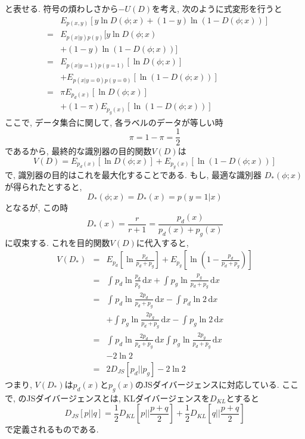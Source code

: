 \documentclass[twocolumn]{jarticle}
\begin{document}
と表せる. 符号の煩わしさから${-U(D)}$を考え, 次のように式変形を行うと
\begin{eqnarray}
  && E_{p(x, y)} [y\ln D(\phi; x) + (1 - y)\ln(1 - D(\phi; x))] \nonumber \\
  &=& E_{p(x|y)p(y)} [y\ln D(\phi; x) \nonumber \\
   && + (1 - y)\ln(1 - D(\phi; x))] \nonumber \\
  &=& E_{p(x|y=1)p(y=1)}[\ln D(\phi;x)] \nonumber \\
  && + E_{p(x|y=0)p(y=0)}[\ln (1 - D(\phi;x))] \nonumber \\
  &=& \pi E_{p_d (x)}[\ln D(\phi;x)] \nonumber \\
  &&+ (1 - \pi) E_{p_g(x)}[\ln (1 - D(\phi; x))]
\end{eqnarray}
ここで, データ集合に関して, 各ラベルのデータが等しい時
\begin{equation}
  \pi = 1 - \pi = \frac{1}{2}
\end{equation}
であるから, 最終的な識別器の目的関数${V(D)}$は
\begin{equation}
  V(D) = E_{p_d(x)}[\ln D(\phi;x)] + E_{p_g(x)}[\ln (1 - D(\phi;x))]
\end{equation}
で, 識別器の目的はこれを最大化することである. もし, 最適な識別器 ${D_\ast(\phi;x)}$が得られたとすると,
\begin{equation}
  D_\ast(\phi;x) = D_\ast(x) = p(y = 1 | x)
\end{equation}
となるが, この時
\begin{equation}
  D_\ast(x) = \frac{r}{r + 1} = \frac{p_d(x)}{p_d(x) + p_g(x)}
\end{equation}
に収束する. これを目的関数${V(D)}$に代入すると,
\begin{eqnarray}
  V(D_\ast) &=& E_{p_d} [\ln \frac{p_d}{p_d + p_g}] + E_{p_g} [\ln (1 - \frac{p_d}{p_d + p_g})] \nonumber \\
  &=& \int_{}^{} p_d \ln \frac{p_d}{p_g} \,\mathrm{d}x  + \int_{}^{} p_g \ln \frac{p_g}{p_d + p_g} \,\mathrm{d}x \nonumber \\
  &=& \int_{}^{} p_d \ln \frac{2p_d}{p_d + p_g} \,\mathrm{d}x  - \int_{}^{} p_d \ln 2 \,\mathrm{d}x \nonumber \\
  &&+ \int_{}^{} p_g \ln \frac{2p_g}{p_d + p_g} \,\mathrm{d}x - \int_{}^{} p_g \ln 2 \,\mathrm{d}x \nonumber \\
  &=& \int_{}^{} p_d \ln \frac{2p_d}{p_d + p_g} \,\mathrm{d}x \int_{}^{} p_g \ln \frac{2p_g}{p_d + p_g} \,\mathrm{d}x \nonumber \\
  &&- 2\ln 2 \nonumber \\
  &=& 2D_{JS}[p_d||p_g] - 2\ln2
\end{eqnarray}
つまり, ${V(D_\ast)}$は${p_d(x)}$と${p_g(x)}$のJSダイバージェンスに対応している. ここで, のJSダイバージェンスとは, KLダイバージェンスを${D_{KL}}$とすると
\begin{equation}
  D_{JS}[p||q] = \frac{1}{2}D_{KL}[p||\frac{p+q}{2}] + \frac{1}{2}D_{KL}[q||\frac{p+q}{2}]
\end{equation}
で定義されるものである.
\end{document}
